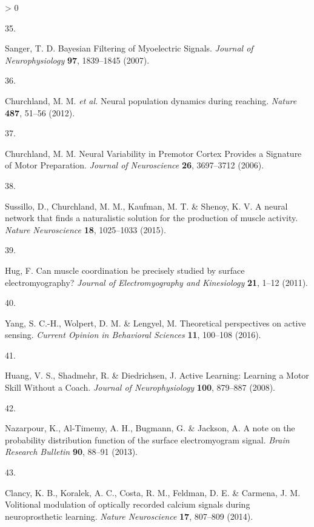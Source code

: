 \documentclass[
  a4paper,
]{article}
\newlength{\cslhangindent}
\newlength{\csllabelwidth}
\newenvironment{CSLReferences}[2] %
 {%
  \setlength{\parindent}{0pt}
  \ifodd #1 \everypar{\setlength{\hangindent}{\cslhangindent}}\ignorespaces\fi
  \ifnum #2 > 0
  \setlength{\parskip}{#2\baselineskip}
  \fi
 }%
 {}
\newcommand{\CSLLeftMargin}[1]{\parbox[t]{\csllabelwidth}{#1}}
\newcommand{\CSLRightInline}[1]{\parbox[t]{\linewidth - \csllabelwidth}{#1}\break}
\begin{document}
\begin{CSLReferences}{0}{0}
\leavevmode\hypertarget{ref-sangerBayesianFilteringMyoelectric2007}{}%
\CSLLeftMargin{35. }
\CSLRightInline{Sanger, T. D. Bayesian {Filtering} of {Myoelectric
Signals}. \emph{Journal of Neurophysiology} \textbf{97}, 1839--1845
(2007).}

\leavevmode\hypertarget{ref-churchlandNeuralPopulationDynamics2012a}{}%
\CSLLeftMargin{36. }
\CSLRightInline{Churchland, M. M. \emph{et al.} Neural population
dynamics during reaching. \emph{Nature} \textbf{487}, 51--56 (2012).}

\leavevmode\hypertarget{ref-churchlandNeuralVariabilityPremotor2006}{}%
\CSLLeftMargin{37. }
\CSLRightInline{Churchland, M. M. Neural {Variability} in {Premotor
Cortex Provides} a {Signature} of {Motor Preparation}. \emph{Journal of
Neuroscience} \textbf{26}, 3697--3712 (2006).}

\leavevmode\hypertarget{ref-sussillo2015}{}%
\CSLLeftMargin{38. }
\CSLRightInline{Sussillo, D., Churchland, M. M., Kaufman, M. T. \&
Shenoy, K. V. A neural network that finds a naturalistic solution for
the production of muscle activity. \emph{Nature Neuroscience}
\textbf{18}, 1025--1033 (2015).}

\leavevmode\hypertarget{ref-Hug2011}{}%
\CSLLeftMargin{39. }
\CSLRightInline{Hug, F. Can muscle coordination be precisely studied by
surface electromyography? \emph{Journal of Electromyography and
Kinesiology} \textbf{21}, 1--12 (2011).}

\leavevmode\hypertarget{ref-yangTheoreticalPerspectivesActive2016}{}%
\CSLLeftMargin{40. }
\CSLRightInline{Yang, S. C.-H., Wolpert, D. M. \& Lengyel, M.
Theoretical perspectives on active sensing. \emph{Current Opinion in
Behavioral Sciences} \textbf{11}, 100--108 (2016).}

\leavevmode\hypertarget{ref-huangActiveLearningLearning2008}{}%
\CSLLeftMargin{41. }
\CSLRightInline{Huang, V. S., Shadmehr, R. \& Diedrichsen, J. Active
{Learning}: {Learning} a {Motor Skill Without} a {Coach}. \emph{Journal
of Neurophysiology} \textbf{100}, 879--887 (2008).}

\leavevmode\hypertarget{ref-nazarpourNoteProbabilityDistribution2013}{}%
\CSLLeftMargin{42. }
\CSLRightInline{Nazarpour, K., Al-Timemy, A. H., Bugmann, G. \& Jackson,
A. A note on the probability distribution function of the surface
electromyogram signal. \emph{Brain Research Bulletin} \textbf{90},
88--91 (2013).}

\leavevmode\hypertarget{ref-Clancy2014}{}%
\CSLLeftMargin{43. }
\CSLRightInline{Clancy, K. B., Koralek, A. C., Costa, R. M., Feldman, D.
E. \& Carmena, J. M. Volitional modulation of optically recorded calcium
signals during neuroprosthetic learning. \emph{Nature Neuroscience}
\textbf{17}, 807--809 (2014).}


\end{CSLReferences}
\end{document}
